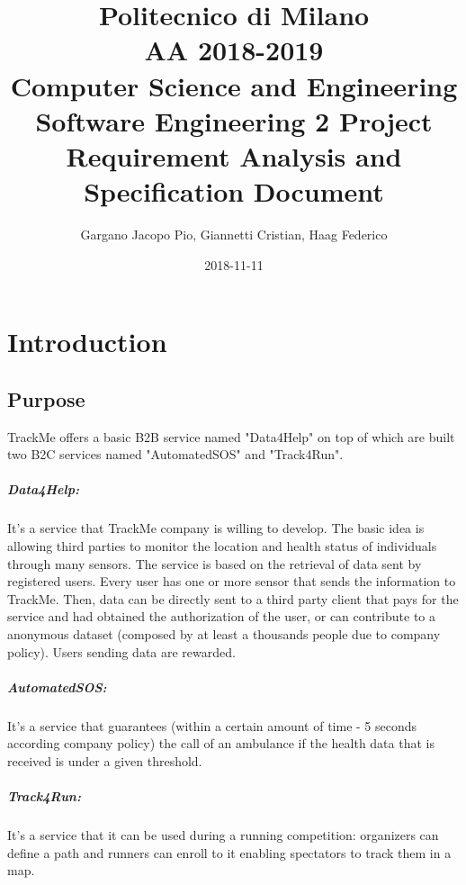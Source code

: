 \documentclass{report}
\title{
\small Politecnico di Milano\\
\small AA 2018-2019\\
\large Computer Science and Engineering\\
\Large Software Engineering 2 Project\\
\huge Requirement Analysis and Specification Document
}
\date{2018-11-11}
\author{
\large Gargano Jacopo Pio, Giannetti Cristian, Haag Federico}
\begin{document}
	\maketitle
	
	\newpage
	\tableofcontents
	
	\newpage
	\chapter{Introduction}
		\section{Purpose}
			TrackMe offers a basic B2B service named "Data4Help" on top of which are built two B2C services named "AutomatedSOS" and "Track4Run".
			\paragraph{Data4Help:}It's a service that TrackMe company is willing to develop. The basic idea is allowing third parties to monitor the location and health status of individuals through many sensors. The service is based on the retrieval of data sent by registered users. Every user has one or more sensor that sends the information to TrackMe. Then, data can be directly sent to a third party client that pays for the service and had obtained the authorization of the user, or can contribute to a anonymous dataset (composed by at least a thousands people due to company policy). Users sending data are rewarded.\\
			
			\paragraph{AutomatedSOS:}It's a service that guarantees (within a certain amount of time - 5 seconds according company policy) the call of an ambulance if the health data that is received is under a given threshold.
			
			\paragraph{Track4Run:}It's a service that it can be used during a running competition: organizers can define a path and runners can enroll to it enabling spectators to track them in a map.
\end{document}
